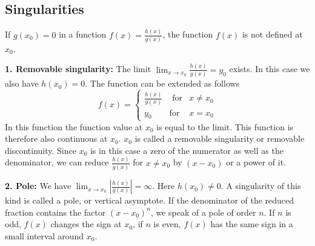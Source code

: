 \documentclass[12pt,eng]{skript_ogg}
\begin{document}
\subsection{Singularities}

If $g(x_0)=0$ in a function $f(x)=\frac{h(x)}{g(x)}$, the function $f(x)$ is not defined at $x_0$. 
\begin{defn}[Singularity]
\textbf{1. Removable singularity:} The limit $\lim_{x\to x_0}\frac{h(x)}{g(x)}=y_0$ exists. In this case we also have $h(x_0)=0$. The function can be extended as follows
\[f(x)=\left\{\begin{array}{lll}\frac{h(x)}{g(x)} & \mbox{ for} & x\neq x_0\\ y_0 & \mbox{for} & x=x_0\end{array}\right.\]
In this function the function value at $x_0$ is equal to the limit. This function is therefore also continuous at $x_0$. $x_0$ is called a removable singularity or removable discontinuity. Since $x_0$ is in this case a zero of the numerator as well as the denominator, we can reduce $\frac{h(x)}{g(x)}$ for $x\neq x_0$ by $(x-x_0)$ or a power of it.

\medskip

\textbf{2. Pole:} We have $\lim_{x\to x_0}\left|\frac{h(x)}{g(x)}\right|=\infty$. Here $h(x_0)\neq0$. A singularity of this kind is called a pole, or vertical asymptote. If the denominator of the reduced fraction contains the factor $(x-x_0)^n$, we speak of a pole of order $n$. If $n$ is odd, $f(x)$ changes the sign at $x_0$, if $n$ is even, $f(x)$ has the same sign in a small interval around $x_0$.
\end{defn}

\vspace{-3mm}
\end{document}
